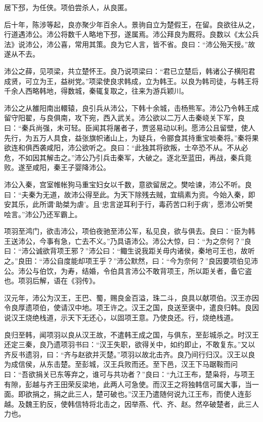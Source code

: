 \documentclass[]{article}
\begin{document}
居下邳，为任侠。项伯尝杀人，从良匿。

后十年，陈涉等起，良亦聚少年百余人。景驹自立为楚假王，在留。良欲往从之，行道遇沛公。沛公将数千人略地下邳，遂属焉。沛公拜良为厩将。良数以《太公兵法》说沛公，沛公喜，常用其策。良为它人言，皆不省。良曰：``沛公殆天授。''故遂从不去。

沛公之薛，见项梁，共立楚怀王。良乃说项梁曰：``君已立楚后，韩诸公子横阳君成贤，可立为王，益树党。''项梁使良求韩成，立为韩王。以良为韩司徒，与韩王将千余人西略韩地，得数城，秦辄复取之，往来为游兵颖川。

沛公之从雒阳南出轘辕，良引兵从沛公，下韩十余城，击杨熊军。沛公乃令韩王成留守阳翟，与良俱南，攻下宛，西入武关。沛公欲以二万人击秦峣关下军，良曰：``秦兵尚强，未可轻。臣闻其将屠者子，贾竖易动以利。愿沛公且留壁，使人先行，为五万人具食，益张旗帜诸山上，为疑兵，令郦食其持重宝啖秦将。''秦将果欲连和俱西袭咸阳，沛公欲听之。良曰：``此独其将欲叛，士卒恐不从。不从必危，不如因其解击之。''沛公乃引兵击秦军，大破之。逐北至蓝田，再战，秦兵竟败。遂至咸阳，秦王子婴降沛公。

沛公入秦，宫室帷帐狗马重宝妇女以千数，意欲留居之。樊哙谏，沛公不听。良曰：``夫秦为无道，故沛公得至此。为天下除残去贼，宜缟素为资。今始入秦，即安其乐，此所谓`助桀为虐'。且`忠言逆耳利于行，毒药苦口利于病'，愿沛公听樊哙言。''沛公乃还军霸上。

项羽至鸿门，欲击沛公，项伯夜驰至沛公军，私见良，欲与俱去。良曰：``臣为韩王送沛公，今事有急，亡去不义。''乃具语沛公。沛公大惊，曰：``为之奈何？''良曰：``沛公诚欲背项王邪？''沛公曰：``鲰生说我距关毋内诸侯，秦地可王也，故听之。''良田：``沛公自度能却项王乎？''沛公默然，曰：``今为奈何？''良因要项伯见沛公。沛公与伯饮，为寿，结婚，令伯具言沛公不敢背项王，所以距关者，备它盗也。项羽后解，语在《羽传》。

汉元年，沛公为汉王，王巴、蜀，赐良金百溢，珠二斗，良具以献项伯。汉王亦因令良厚遗项伯，使请汉中地。项王许之。汉王之国，良送至褒中，遣良归韩。良因说汉王烧绝栈道，示天下无还心，以固项王意。乃使良还。行，烧绝栈道。

良归至韩，闻项羽以良从汉王故，不遣韩王成之国，与俱东，至彭城杀之。时汉王还定三秦，良乃遗项羽书曰：``汉王失职，欲得关中，如约即止，不敢复东。''又以齐反书遗羽，曰：``齐与赵欲并灭楚。''项羽以故北击齐。良乃间行归汉。汉王以良为成信侯，从东击楚。至彭城，汉王兵败而还。至下邑，汉王下马踞鞍而问曰：``吾欲捐关已东等弃之，谁可与共功者？''良曰：``九江王布，楚枭将，与项王有隙，彭越与齐王田荣反梁地，此两人可急使。而汉王之将独韩信可属大事，当一面。即欲捐之，捐之此三人，楚可破也。''汉王乃遣随何说九江王布，而使人连彭越。及魏王豹反，使韩信特将北击之，因举燕、代、齐、赵。然卒破楚者，此三人力也。
\end{document}
